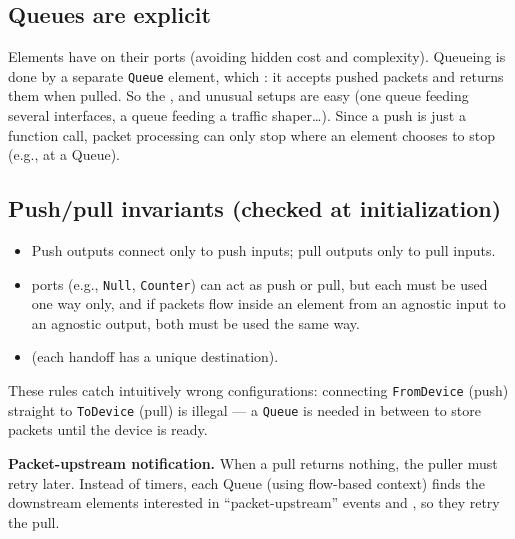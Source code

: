 \subsection{Queues are explicit}
Elements have  on their ports (avoiding hidden cost and complexity). Queueing is done by a separate \texttt{Queue} element, which : it accepts pushed packets and returns them when pulled. So the , and unusual setups are easy (one queue feeding several interfaces, a queue feeding a traffic shaper\ldots). Since a push is just a function call, packet processing can only stop where an element chooses to stop (e.g., at a Queue).

\subsection{Push/pull invariants (checked at initialization)}
\begin{itemize}
\item Push outputs connect only to push inputs; pull outputs only to pull inputs.
\item {} ports (e.g., \texttt{Null}, \texttt{Counter}) can act as push or pull, but each must be used one way only, and if packets flow inside an element from an agnostic input to an agnostic output, both must be used the same way.
\item {} (each handoff has a unique destination).
\end{itemize}
These rules catch intuitively wrong configurations: connecting \texttt{FromDevice} (push) straight to \texttt{ToDevice} (pull) is illegal --- a \texttt{Queue} is needed in between to store packets until the device is ready.

\textbf{Packet-upstream notification.} When a pull returns nothing, the puller must retry later. Instead of timers, each Queue (using flow-based context) finds the downstream elements interested in ``packet-upstream'' events and , so they retry the pull.

